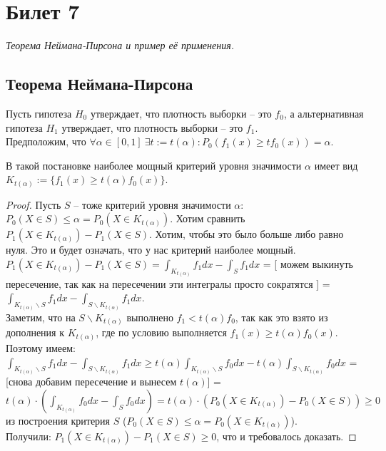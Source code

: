 \section{Билет 7}

\begin{center}
    \it
    Теорема Неймана-Пирсона и пример её применения.
\end{center}

\subsection{Теорема Неймана-Пирсона}
Пусть гипотеза $H_0$ утверждает, что плотность выборки -- это $f_0$, а альтернативная
гипотеза $H_1$ утверждает, что плотность выборки -- это $f_1$. \\
Предположим, что
 $\forall \alpha \in [0, 1] \ \exists t := t(\alpha): P_0(f_1(x) \geqslant tf_0(x)) = \alpha$. 

\begin{theorem*}
     В такой постановке наиболее мощный критерий уровня значимости $\alpha$ имеет вид \\
    $K_{t(\alpha)} := \{ f_1(x) \geqslant t(\alpha)f_0(x)\}$.
\end{theorem*}
\begin{proof}
    Пусть $S$ -- тоже критерий уровня значимости $\alpha$: $P_0(X \in S) \leqslant \alpha = P_0(X \in K_{t(\alpha)})$.
    Хотим сравнить $P_1(X \in K_{t(\alpha)}) - P_1(X \in S)$. Хотим, чтобы это было больше либо равно нуля. Это и будет
    означать, что у нас критерий наиболее мощный. \\
    $\displaystyle P_1(X \in K_{t(\alpha)}) - P_1(X \in S) = \int_{K_{t(\alpha)}}f_1dx - \int_{S}f_1dx$ = [
        можем выкинуть пересечение, так как на пересечении эти интегралы просто сократятся
    ] = $\int_{K_{t(\alpha)}\backslash S}f_1dx - \int_{S\backslash K_{t(\alpha)}}f_1dx$. \\
    Заметим, что на $S\backslash K_{t(\alpha)}$ выполнено $f_1 < t(\alpha)f_0$, так как это взято из
    дополнения к $K_{t(\alpha)}$, где по условию выполняется $ f_1(x) \geqslant t(\alpha)f_0(x)$. Поэтому имеем: 
    $\int_{K_{t(\alpha)}\backslash S}f_1dx - \int_{S\backslash K_{t(\alpha)}}f_1dx \geqslant
    t(\alpha) \int_{K_{t(\alpha)}\backslash S}f_0dx - t(\alpha)\int_{S\backslash K_{t(\alpha)}}f_0dx$ = [снова добавим пересечение
    и вынесем $t(\alpha)$] = $t(\alpha) \cdot (\int_{K_{t(\alpha)}}f_0dx - \int_{S}f_0dx) =
    t(\alpha) \cdot (P_0(X \in K_{t(\alpha)}) - P_0(X \in S)) \geqslant 0$ из построения критерия
     $S$ ($P_0(X \in S) \leqslant \alpha = P_0(X \in K_{t(\alpha)})$). \\
     
    Получили: $P_1(X \in K_{t(\alpha)}) - P_1(X \in S) \geqslant 0$, что и требовалось доказать.
\end{proof}

